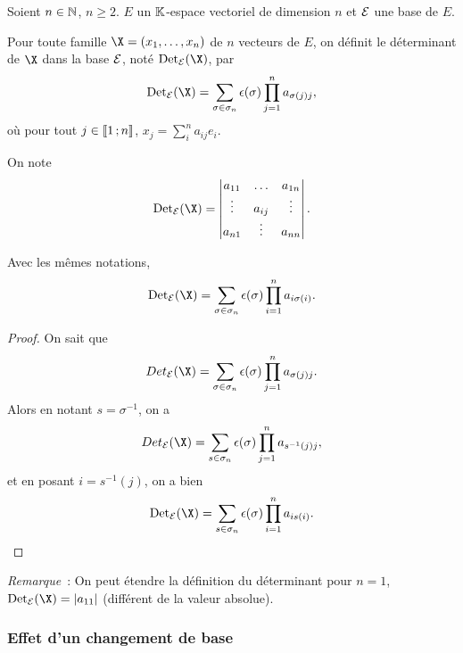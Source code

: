 Soient $n \in \mathbb{N}$, $n\geq 2$. $E$ un $\mathbb{K}$-espace vectoriel de dimension $n$ et $\mathcal{E}$ une base de $E$.
\begin{defdef}
  Pour toute famille $\X=(x_1, \ldots, x_n)$ de $n$ vecteurs de $E$, on définit le déterminant de $\X$ dans la base $\mathcal{E}$, noté $\Det_\E(\X)$, par
  \begin{equation}
    \Det_\E(\X) = \sum_{\sigma \in \sigma_n}\epsilon(\sigma) \prod_{j=1}^n a_{\sigma(j)j},
  \end{equation}
  où pour tout $j \in \mathopen{\llbracket}1\mathclose{}\mathpunct{};n\mathclose{\rrbracket}$, $x_j=\sum_{i}^n a_{ij}e_i$.
\end{defdef}
On note 
\begin{equation}
  \Det_\E(\X) = \begin{vmatrix} a_{11} & \ldots & a_{1n} \\ \vdots & a_{ij} & \vdots \\ a_{n1} & \vdots & a_{nn}\end{vmatrix}.
\end{equation}
%
\begin{prop}
 Avec les mêmes notations,
 \begin{equation}
    \Det_\E(\X) = \sum_{\sigma \in \sigma_n}\epsilon(\sigma) \prod_{i=1}^n a_{i\sigma(i)}.
 \end{equation}
\end{prop}
\begin{proof}
  On sait que
  \begin{equation}
    Det_\E(\X) = \sum_{\sigma \in \sigma_n}\epsilon(\sigma) \prod_{j=1}^n a_{\sigma(j)j}.
  \end{equation}
  Alors en notant $s=\sigma^{-1}$, on a
  \begin{equation}
    Det_\E(\X) = \sum_{s \in \sigma_n}\epsilon(\sigma) \prod_{j=1}^n a_{s^{-1}(j)j},
  \end{equation}
  et en posant $i=s^{-1}(j)$, on a bien
   \begin{equation}
    \Det_\E(\X) = \sum_{s \in \sigma_n}\epsilon(\sigma) \prod_{i=1}^n a_{is(i)}.
  \end{equation}
\end{proof}

\emph{Remarque}~: On peut étendre la définition du déterminant pour $n=1$, $\Det_\E(\X) = \abs{a_{11}}$ (\danger différent de la valeur absolue).

\subsubsection{Effet d'un changement de base}

